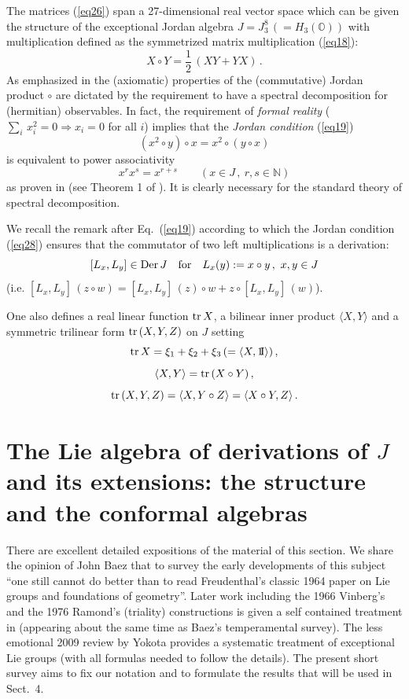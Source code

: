 \documentclass{article}
\newcommand{\be}{\begin{equation}}
\newcommand{\ee}{\end{equation}}
\def\un{{\rm 1\mkern-4mu I}}
\begin{document}
The matrices (\ref{eq26}) span a 27-dimensional real vector space which can be given the structure of the exceptional Jordan algebra $J = J_3^8 \, (= H_3 ({\mathbb O}))$ with multiplication defined as the symmetrized matrix multiplication (\ref{eq18}):
\be
\label{eq27}
X \circ Y = \frac12 \, (XY + YX) \, .
\ee
As emphasized in \cite{DV} the (axiomatic) properties of the (commutative) Jordan product $\circ$ are dictated by the requirement to have a spectral decomposition for (hermitian) observables. In fact, the requirement of {\it formal reality} ($\underset{i}{\sum} \, x_i^2 = 0 \Rightarrow x_i = 0$ for all $i$) implies that the {\it Jordan condition} (\ref{eq19})
\be
\label{eq28}
(x^2 \circ y) \circ x = x^2 \circ (y \circ x)
\ee
is equivalent to power associativity 
\be
\label{eq29}
x^r x^s = x^{r+s} \qquad (x \in J \, , \ r,s \in {\mathbb N})
\ee
as proven in \cite{JvNW} (see Theorem 1 of \cite{DV}). It is clearly necessary for the standard theory of spectral decomposition.

\smallskip

We recall the remark after Eq.~(\ref{eq19}) according to which the Jordan condition (\ref{eq28}) ensures that the commutator of two left multiplications is a derivation:
\be
\label{eq210}
[L_x , L_y] \in {\rm Der} \, J \quad \mbox{for} \quad L_x (y) := x \circ y \, , \ x,y \in J
\ee
(i.e. $[L_x , L_y] \, (z \circ w) = [L_x , L_y] \, (z) \circ w + z \circ [L_x , L_y] \, (w)$).

\smallskip

One also defines a real linear function ${\rm tr} \, X$, a bilinear inner product $\langle X,Y \rangle$ and a symmetric trilinear form ${\rm tr} \, (X,Y,Z)$ on $J$ setting
$$
{\rm tr} \, X = \xi_1 + \xi_2 + \xi_3 \, (= \langle X , \un \rangle) \, ,
$$
$$
\langle X,Y \rangle = {\rm tr} \, (X \circ Y) \, ,
$$
\be
\label{eq211}
{\rm tr} \, (X,Y,Z) = \langle X , Y \circ Z \rangle = \langle X \circ Y , Z \rangle \, .
\ee


\section{The Lie algebra of derivations of $J$ and its extensions: the structure and the conformal algebras}\label{sec3}
\setcounter{equation}{0}

There are excellent detailed expositions of the material of this section. We share the opinion of John Baez \cite {B} that to survey the early developments of this subject ``one still cannot do better than to read Freudenthal's classic 1964 paper \cite{F} on Lie groups and foundations of geometry''. Later work including the 1966 Vinberg's and the 1976 Ramond's (triality) constructions is given a self contained treatment in \cite{BS} (appearing about the same time as Baez's temperamental survey). The less emotional 2009 review by Yokota \cite{Y} provides a systematic treatment of exceptional Lie groups (with all formulas needed to follow the details). The present short survey aims to fix our notation and to formulate the results that will be used in Sect.~4.
\end{document}
